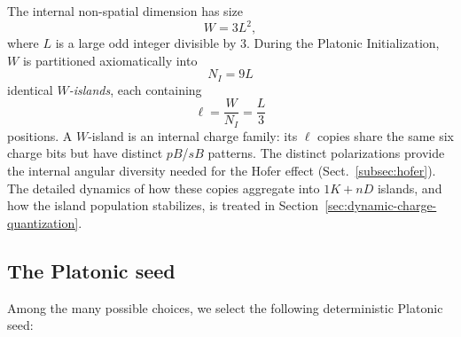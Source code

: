 \documentclass{ijuc}
\begin{document}
The internal non-spatial dimension has size
\begin{equation}
W=3L^{2},
\end{equation}
where $L$ is a large odd integer divisible by $3$.
During the Platonic Initialization, $W$ is partitioned axiomatically into
\begin{equation}
N_{I}=9L
\end{equation}
identical \emph{$W$-islands}, each containing
\begin{equation}
\ell=\frac{W}{N_{I}}=\frac{L}{3}
\end{equation}
positions.
A $W$-island is an internal charge family: its $\ell$ copies share the same six charge bits but have distinct $pB$/$sB$ patterns.
The distinct polarizations provide the internal angular diversity needed for the Hofer effect (Sect.~\ref{subsec:hofer}).
The detailed dynamics of how these copies aggregate into $1K+nD$ islands, and how the island population stabilizes, is treated in Section~\ref{sec:dynamic-charge-quantization}.

\subsection{The Platonic seed}

Among the many possible choices, we select the following deterministic Platonic seed:
\end{document}
